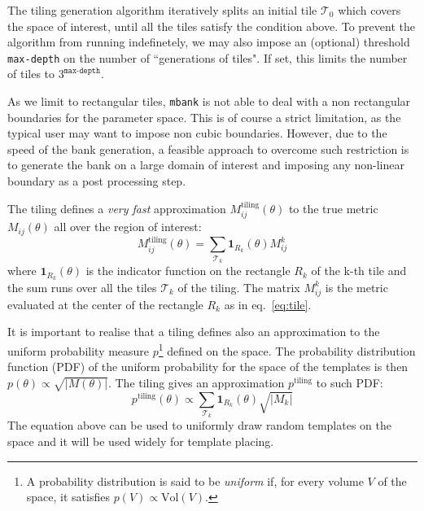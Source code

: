 \documentclass[twocolumn,showpacs,preprintnumbers,nofootinbib,prd,
superscriptaddress,10pt]{revtex4-2}
\begin{document}
The tiling generation algorithm iteratively splits an initial tile $\mathcal{T}_{0}$ which covers the space of interest, until all the tiles satisfy the condition above.
To prevent the algorithm from running indefinetely, we may also impose an (optional) threshold \texttt{max-depth} on the number of ``generations of tiles". If set, this limits the number of tiles to $3^{\texttt{max-depth}}$.

As we limit to rectangular tiles, \texttt{mbank} is not able to deal with a non rectangular boundaries for the parameter space. This is of course a strict limitation, as the typical user may want to impose non cubic boundaries. However, due to the speed of the bank generation, a feasible approach to overcome such restriction is to generate the bank on a large domain of interest and imposing any non-linear boundary as a post processing step. 

The tiling defines a {\it very fast} approximation $M^{\text{tiling}}_{ij}(\theta)$ to the true metric $M_{ij}(\theta)$ all over the region of interest:
\begin{equation}\label{eq:metric_tiling}
	M^{\text{tiling}}_{ij}(\theta) = \sum_{\mathcal{T}_k} \mathbf{1}_{R_k}(\theta) M^{k}_{ij}
\end{equation}
where $\mathbf{1}_{R_k}(\theta)$ is the indicator function on the rectangle $R_k$ of the k-th tile and the sum runs over all the tiles $\mathcal{T}_k$ of the tiling. The matrix $M^{k}_{ij}$ is the metric evaluated at the center of the rectangle $R_k$ as in eq.~\eqref{eq:tile}.

It is important to realise that a tiling defines also an approximation to the uniform probability measure $p$\footnote{
A probability distribution is said to be {\it uniform} if, for every volume $V$ of the space, it satisfies $p(V) \propto \text{Vol}(V)$.}
defined on the space.
The probability distribution function (PDF) of the uniform probability for the space of the templates is then $p(\theta) \propto \sqrt{|M(\theta)|}$.
The tiling gives an approximation $p^{\text{tiling}}$ to such PDF:
\begin{equation}\label{eq:tiling_pdf}
	p^{\text{tiling}}(\theta) \propto \sum_{\mathcal{T}_k} \mathbf{1}_{R_k}(\theta) \sqrt{|M_k|}
\end{equation}
The equation above can be used to uniformly draw random templates on the space and it will be used widely for template placing.
\end{document}
